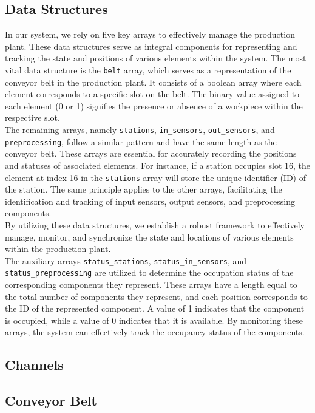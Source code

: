 \documentclass[11pt, oneside]{article}
\begin{document}
\subsection{Data Structures}
In our system, we rely on five key arrays to effectively manage the production plant. These data structures serve as integral components for representing and tracking the state and positions of various elements within the system.
The most vital data structure is the \texttt{belt} array, which serves as a representation of the conveyor belt in the production plant. It consists of a boolean array where each element corresponds to a specific slot on the belt. The binary value assigned to each element (0 or 1) signifies the presence or absence of a workpiece within the respective slot.\\
The remaining arrays, namely \texttt{stations}, \texttt{in\_sensors}, \texttt{out\_sensors}, and \texttt{preprocessing}, follow a similar pattern and have the same length as the conveyor belt. These arrays are essential for accurately recording the positions and statuses of associated elements. For instance, if a station occupies slot 16, the element at index 16 in the \texttt{stations} array will store the unique identifier (ID) of the station. The same principle applies to the other arrays, facilitating the identification and tracking of input sensors, output sensors, and preprocessing components.\\
By utilizing these data structures, we establish a robust framework to effectively manage, monitor, and synchronize the state and locations of various elements within the production plant.\\
The auxiliary arrays \texttt{status\_stations}, \texttt{status\_in\_sensors}, and \texttt{status\_preprocessing} are utilized to determine the occupation status of the corresponding components they represent. These arrays have a length equal to the total number of components they represent, and each position corresponds to the ID of the represented component. A value of 1 indicates that the component is occupied, while a value of 0 indicates that it is available. By monitoring these arrays, the system can effectively track the occupancy status of the components.
\subsection{Channels}

\subsection{Conveyor Belt}
\end{document}
